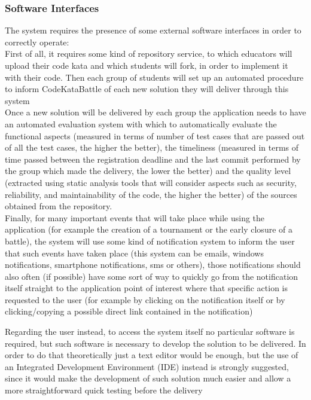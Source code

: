 \documentclass[../RASD.tex]{subfiles}
\begin{document}
        \subsubsection{Software Interfaces}
            The system requires the presence of some external software interfaces in order to correctly operate:\\
            First of all, it requires some kind of repository service, to which educators will upload their code kata and which students will fork, in order to implement it with their code. Then each group of students will set up an automated procedure to inform CodeKataBattle of each new solution they will deliver through this system\\
            Once a new solution will be delivered by each group the application needs to have an automated evaluation system with which to automatically evaluate the functional aspects (measured in terms of number of test cases that are passed out of all the test cases, the higher the better), the timeliness (measured in terms of time passed between the registration deadline and the last commit performed by the group which made the delivery, the lower the better) and the quality level (extracted using static analysis tools that will consider aspects such as security, reliability, and maintainability of the code, the higher the better) of the sources obtained from the repository.\\
            Finally, for many important events that will take place while using the application (for example the creation of a tournament or the early closure of a battle), the system will use some kind of notification system to inform the user that such events have taken place (this system can be emails, windows notifications, smartphone notifications, sms or others), those notifications should also often (if possible) have some sort of way to quickly go from the notification itself straight to the application point of interest where that specific action is requested to the user (for example by clicking on the notification itself or by clicking/copying a possible direct link contained in the notification)
            \restoregeometry

            Regarding the user instead, to access the system itself no particular software is required, but such software is necessary to develop the solution to be delivered. In order to do that theoretically just a text editor would be enough, but the use of an Integrated Development Environment (IDE) instead is strongly suggested, since it would make the development of such solution much easier and allow a more straightforward quick testing before the delivery
\end{document}
